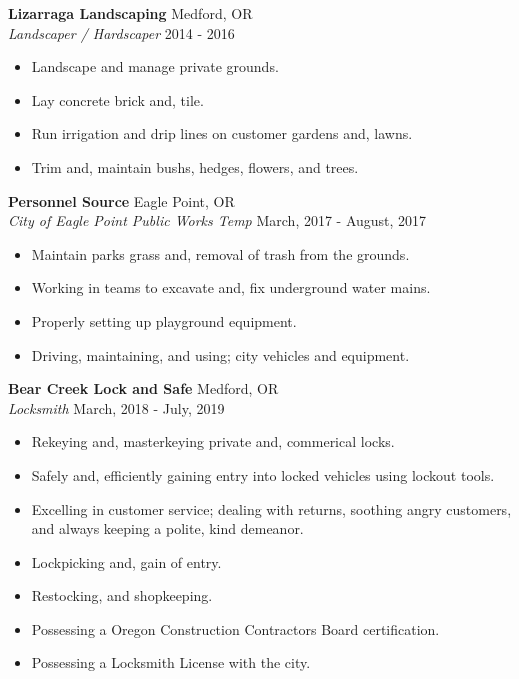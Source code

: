 \documentclass[a4paper]{article}
\begin{document}
\textbf{Lizarraga Landscaping} \hfill Medford, OR\\
\textit{Landscaper / Hardscaper} \hfill 2014 - 2016\\
\vspace{-1mm}
\begin{itemize} \itemsep 1pt
	\item Landscape and manage private grounds.
	\item Lay concrete brick and, tile.
	\item Run irrigation and drip lines on customer gardens and, lawns.
	\item Trim and, maintain bushs, hedges, flowers, and trees.
\end{itemize}
\textbf{Personnel Source} \hfill Eagle Point, OR\\
\textit{City of Eagle Point Public Works Temp} \hfill March, 2017 - August, 2017\\
\vspace{-1mm}
\begin{itemize} \itemsep 1pt
	\item Maintain parks grass and, removal of trash from the grounds.
	\item Working in teams to excavate and, fix underground water mains.
	\item Properly setting up playground equipment.
	\item Driving, maintaining, and using; city vehicles and equipment.
\end{itemize}
\textbf{Bear Creek Lock and Safe} \hfill Medford, OR\\
\textit{Locksmith} \hfill March, 2018 - July, 2019\\
\vspace{-1mm}
\begin{itemize} \itemsep 1pt
	\item Rekeying and, masterkeying private and, commerical locks.
	\item Safely and, efficiently gaining entry into locked vehicles using lockout tools.
	\item Excelling in customer service; dealing with returns, soothing angry customers, and always keeping a polite, kind demeanor.
	\item Lockpicking and, gain of entry.
	\item Restocking, and shopkeeping.
	\item Possessing a Oregon Construction Contractors Board certification.
	\item Possessing a Locksmith License with the city.
\end{itemize}
\end{document}
